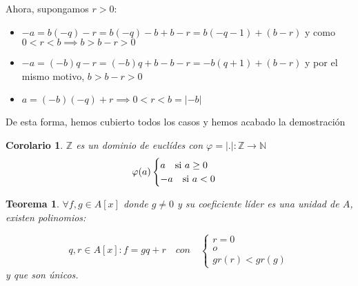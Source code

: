 \documentclass[11pt, a4paper, titlepage]{article}
\makeatletter
\renewenvironment{proof}[1][\proofname] {\vspace{-15pt}\par\pushQED{\qed}\normalfont\topsep6\p@\@plus6\p@\relax\trivlist\item[\hskip\labelsep\it#1\@addpunct{.}]\ignorespaces}{\popQED\endtrivlist\@endpefalse}
\providecommand{\ent}{\mathbb{Z}}
\providecommand{\nat}{\mathbb{N}}
\providecommand{\abs}[1]{\lvert#1\rvert}
\theoremstyle{theorem-style}
\newtheorem*{nth}{Teorema}
\newtheorem{ncor}{Corolario}
\theoremstyle{definition-style}
\theoremstyle{remark-style}
\theoremstyle{example-style}
\makeatother
\begin{document}
\begin{proof}
Ahora, supongamos $r > 0$:

\begin{itemize}
	\item $-a = b(-q) -r = b(-q) -b + b -r = b(-q-1) +(b-r)$ y como $0 < r < b \implies b > b-r > 0$
	\item $-a = (-b)q -r = (-b)q + b - b -r = -b(q+1) + (b-r)$ y por el mismo motivo, $b > b-r > 0$
	\item $a = (-b)(-q) +r \implies 0 < r < b = \abs{-b}$
\end{itemize}

De esta forma, hemos cubierto todos los casos y hemos acabado la demostración
\end{proof}

\begin{ncor}
$\ent$ es un dominio de euclídes con $\varphi = \abs{.}: \ent \to \nat$
\[
\varphi(a) \begin{cases}
	a  \quad \textup{si } a \ge 0\\
	-a \quad \textup{si } a < 0
	
\end{cases}\]
\end{ncor}

\begin{nth}
		$\forall f,g \in A[x]$ donde $g \neq 0 $ y su coeficiente líder es una unidad de $A$, existen polinomios:
	
	\[
	q,r \in A[x] : f = gq + r \quad con \quad
	 \begin{cases}
		r = 0\\
		o\\
		gr(r) < gr(g)
	\end{cases}
	\]
	y que son únicos.
\end{nth}
\end{document}
